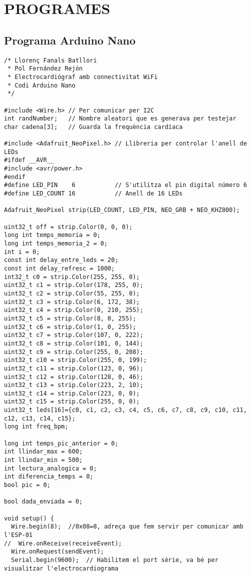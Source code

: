 \chapter{\uppercase{Programes}}

\section{Programa Arduino Nano}
\begin{lstlisting}[style=myArduino]
/* Llorenç Fanals Batllori
 * Pol Fernández Rejón
 * Electrocardiógraf amb connectivitat WiFi
 * Codi Arduino Nano
 */
 
#include <Wire.h> // Per comunicar per I2C
int randNumber;   // Nombre aleatori que es generava per testejar
char cadena[3];   // Guarda la frequència cardíaca

#include <Adafruit_NeoPixel.h> // Llibreria per controlar l'anell de LEDs
#ifdef __AVR__
#include <avr/power.h>
#endif
#define LED_PIN    6           // S'utilitza el pin digital número 6
#define LED_COUNT 16           // Anell de 16 LEDs

Adafruit_NeoPixel strip(LED_COUNT, LED_PIN, NEO_GRB + NEO_KHZ800);

uint32_t off = strip.Color(0, 0, 0);
long int temps_memoria = 0;
long int temps_memoria_2 = 0;
int i = 0;
const int delay_entre_leds = 20;
const int delay_refresc = 1000;
int32_t c0 = strip.Color(255, 255, 0);
uint32_t c1 = strip.Color(178, 255, 0);
uint32_t c2 = strip.Color(55, 255, 0);
uint32_t c3 = strip.Color(6, 172, 38);
uint32_t c4 = strip.Color(0, 210, 255);
uint32_t c5 = strip.Color(8, 0, 255);
uint32_t c6 = strip.Color(1, 0, 255);
uint32_t c7 = strip.Color(107, 0, 222);
uint32_t c8 = strip.Color(101, 0, 144);
uint32_t c9 = strip.Color(255, 0, 208);
uint32_t c10 = strip.Color(255, 0, 199);
uint32_t c11 = strip.Color(123, 0, 96);
uint32_t c12 = strip.Color(128, 0, 46);
uint32_t c13 = strip.Color(223, 2, 10);
uint32_t c14 = strip.Color(223, 0, 0);
uint32_t c15 = strip.Color(255, 0, 0);
uint32_t leds[16]={c0, c1, c2, c3, c4, c5, c6, c7, c8, c9, c10, c11, c12, c13, c14, c15};
long int freq_bpm;

long int temps_pic_anterior = 0;
int llindar_max = 600;
int llindar_min = 500;
int lectura_analogica = 0;
int diferencia_temps = 0;
bool pic = 0;

bool dada_enviada = 0;

void setup() {
  Wire.begin(8);  //0x08=8, adreça que fem servir per comunicar amb l'ESP-01
//  Wire.onReceive(receiveEvent);
  Wire.onRequest(sendEvent);
  Serial.begin(9600);  // Habilitem el port sèrie, va bé per visualitzar l'electrocardiograma


\end{lstlisting}
